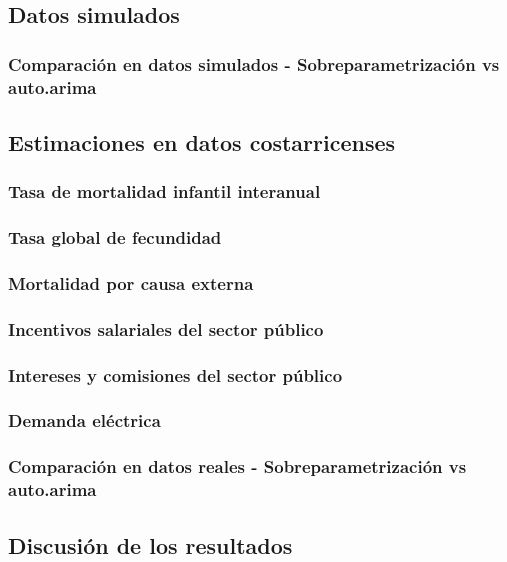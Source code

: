 \documentclass[
]{article}
\begin{document}
\subsection{Datos simulados}

\subsubsection{Comparación en datos simulados - Sobreparametrización vs auto.arima}

\subsection{Estimaciones en datos costarricenses}

\subsubsection{Tasa de mortalidad infantil interanual}

\subsubsection{Tasa global de fecundidad}

\subsubsection{Mortalidad por causa externa}

\subsubsection{Incentivos salariales del sector público}

\subsubsection{Intereses y comisiones del sector público}

\subsubsection{Demanda eléctrica}

\subsubsection{Comparación en datos reales - Sobreparametrización vs auto.arima}

\subsection{Discusión de los resultados}
\end{document}
